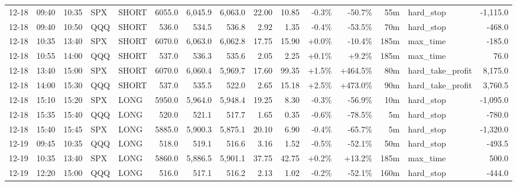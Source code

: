 \documentclass[11pt,a4paper,twoside]{article}
\begin{document}
\begin{landscape}
\begin{center}
\begin{longtable}{>{\color{txtmain}}l l l l l r r r r r r r r >{\color{txtmain}}l r}
12-18 & 09:40 & 10:35 & SPX & SHORT & 6055.0 & 6,045.9 & 6,063.0 & 22.00 & 10.85 & \textcolor{lossred}{-0.3\%} & \textcolor{lossred}{-50.7\%} & 55m & hard\_stop & \textcolor{lossred}{-1,115.0} \\
12-18 & 09:40 & 10:50 & QQQ & SHORT & 536.0 & 534.5 & 536.8 & 2.92 & 1.35 & \textcolor{lossred}{-0.4\%} & \textcolor{lossred}{-53.5\%} & 70m & hard\_stop & \textcolor{lossred}{-468.0} \\
12-18 & 10:35 & 13:40 & SPX & SHORT & 6070.0 & 6,063.0 & 6,062.8 & 17.75 & 15.90 & \textcolor{wingreen}{+0.0\%} & \textcolor{lossred}{-10.4\%} & 185m & max\_time & \textcolor{lossred}{-185.0} \\
12-18 & 10:55 & 14:00 & QQQ & SHORT & 537.0 & 536.3 & 535.6 & 2.05 & 2.25 & \textcolor{wingreen}{+0.1\%} & \textcolor{wingreen}{+9.2\%} & 185m & max\_time & \textcolor{wingreen}{76.0} \\
12-18 & 13:40 & 15:00 & SPX & SHORT & 6070.0 & 6,060.4 & 5,969.7 & 17.60 & 99.35 & \textcolor{wingreen}{+1.5\%} & \textcolor{wingreen}{+464.5\%} & 80m & hard\_take\_profit & \textcolor{wingreen}{8,175.0} \\
12-18 & 14:00 & 15:30 & QQQ & SHORT & 537.0 & 535.5 & 522.0 & 2.65 & 15.18 & \textcolor{wingreen}{+2.5\%} & \textcolor{wingreen}{+473.0\%} & 90m & hard\_take\_profit & \textcolor{wingreen}{3,760.5} \\
12-18 & 15:10 & 15:20 & SPX & LONG & 5950.0 & 5,964.0 & 5,948.4 & 19.25 & 8.30 & \textcolor{lossred}{-0.3\%} & \textcolor{lossred}{-56.9\%} & 10m & hard\_stop & \textcolor{lossred}{-1,095.0} \\
12-18 & 15:35 & 15:40 & QQQ & LONG & 520.0 & 521.1 & 517.7 & 1.65 & 0.35 & \textcolor{lossred}{-0.6\%} & \textcolor{lossred}{-78.5\%} & 5m & hard\_stop & \textcolor{lossred}{-780.0} \\
12-18 & 15:40 & 15:45 & SPX & LONG & 5885.0 & 5,900.3 & 5,875.1 & 20.10 & 6.90 & \textcolor{lossred}{-0.4\%} & \textcolor{lossred}{-65.7\%} & 5m & hard\_stop & \textcolor{lossred}{-1,320.0} \\
12-19 & 09:45 & 10:35 & QQQ & LONG & 518.0 & 519.1 & 516.6 & 3.16 & 1.52 & \textcolor{lossred}{-0.5\%} & \textcolor{lossred}{-52.1\%} & 50m & hard\_stop & \textcolor{lossred}{-493.5} \\
12-19 & 10:35 & 13:40 & SPX & LONG & 5860.0 & 5,886.5 & 5,901.1 & 37.75 & 42.75 & \textcolor{wingreen}{+0.2\%} & \textcolor{wingreen}{+13.2\%} & 185m & max\_time & \textcolor{wingreen}{500.0} \\
12-19 & 12:20 & 15:00 & QQQ & LONG & 516.0 & 517.1 & 516.2 & 2.13 & 1.02 & \textcolor{lossred}{-0.2\%} & \textcolor{lossred}{-52.1\%} & 160m & hard\_stop & \textcolor{lossred}{-444.0} \\

\end{longtable}
\end{center}
\end{landscape}
\end{document}

